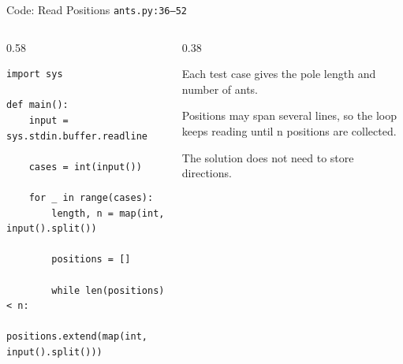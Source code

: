 \documentclass[aspectratio=169,11pt]{beamer}
\begin{document}
\begin{frame}[fragile]{Code: Read Positions}
\scriptsize
{} \texttt{ants.py:36--52}

\vspace{0.08cm}
\begin{columns}[T,totalwidth=\textwidth]
\begin{column}{0.58\textwidth}
\begin{lstlisting}[style=cpcode]
import sys

def main():
    input = sys.stdin.buffer.readline

    cases = int(input())

    for _ in range(cases):
        length, n = map(int, input().split())

        positions = []

        while len(positions) < n:
            positions.extend(map(int, input().split()))
\end{lstlisting}
\end{column}
\begin{column}{0.38\textwidth}
\begin{tightitemize}
  \item Each test case gives the pole length and number of ants.
  \item Positions may span several lines, so the loop keeps reading until n positions are collected.
  \item The solution does not need to store directions.
\end{tightitemize}
\end{column}
\end{columns}
\end{frame}
\end{document}

